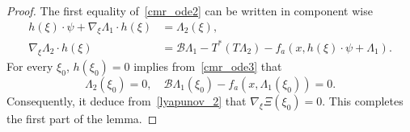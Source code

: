 \documentclass{elsarticle}
\begin{document}
\begin{proof}
The first equality of~\eqref{cmr_ode2} can be written in component wise
\begin{equation}\label{cmr_ode3}
\begin{split}
	  h(\xi)\cdot \psi + \nabla_{\xi}\Lambda_1 \cdot h(\xi) &= \Lambda_2(\xi),\\
	\nabla_{\xi}\Lambda_2 \cdot h(\xi) &= \mathcal{B}\Lambda_1 - T^\ast(T\Lambda_2) - f_a(x, h(\xi)\cdot \psi +\Lambda_1).
\end{split}
\end{equation}
For every $\xi_0$, $h(\xi_0) = 0$ implies from~\eqref{cmr_ode3} that 
\[
\Lambda_2(\xi_0) = 0, \quad \mathcal{B}\Lambda_1(\xi_0) - f_a(x, \Lambda_1(\xi_0)) = 0.
\]
Consequently, it deduce from~\eqref{lyapunov_2} that $\nabla_{\xi}\Xi(\xi_0) = 0$. This completes the first part of the lemma.


\end{proof}
\end{document}
